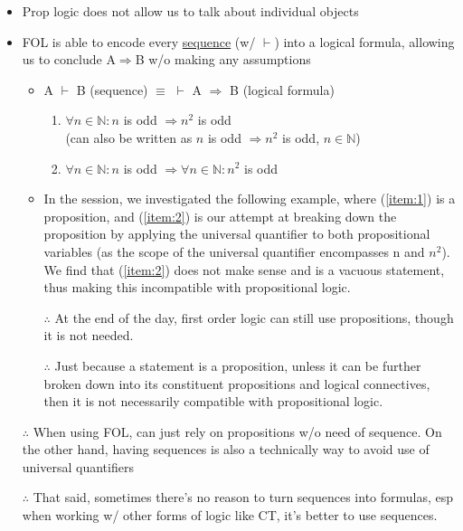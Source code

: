 \documentclass{article}
\begin{document}
\begin{itemize}
  \item Prop logic does not allow us to talk about individual objects
  \item FOL is able to encode every \underline{sequence} (w/ $\vdash$) into a logical formula, allowing us to conclude A$\Rightarrow$B w/o making any assumptions
  \begin{itemize}
    \item A $\vdash$ B (sequence) $\equiv$ $\vdash$ A $\Rightarrow$ B (logical formula)
    \begingroup
    \renewcommand\labelenumi{(\theenumi)}
    \begin{enumerate}
    \item $\forall n \in \mathbb{N} : n$ is odd $\Rightarrow n^2$ is odd  \\ (can also be written as $n$ is odd $\Rightarrow n^2$ is odd, $n \in \mathbb{N}$) \label{item:1}
    \item $\forall n \in \mathbb{N} : n$ is odd $\Rightarrow \forall n \in \mathbb{N} : n^2$ is odd  \label{item:2}
    \end{enumerate}
    \endgroup
    \item In the session, we investigated the following example, where (\ref{item:1}) is a proposition, and (\ref{item:2}) is our attempt at breaking down the proposition by applying the universal quantifier to both propositional variables (as the scope of the universal quantifier encompasses n and \(n^2\)). We find that (\ref{item:2}) does not make sense and is a vacuous statement, thus making this incompatible with propositional logic.
    \item[$\therefore$] At the end of the day, first order logic can still use propositions, though it is not needed.
    \item[$\therefore$] Just because a statement is a proposition, unless it can be further broken down into its constituent propositions and logical connectives, then it is not necessarily compatible with propositional logic.
  \end{itemize}
  \item[$\therefore$] When using FOL, can just rely on propositions w/o need of sequence. On the other hand, having sequences is also a technically way to avoid use of universal quantifiers
  \item[$\therefore$] That said, sometimes there’s no reason to turn sequences into formulas, esp when working w/ other forms of logic like CT, it’s better to use sequences.
\end{itemize}
\end{document}
